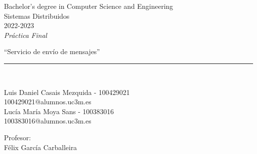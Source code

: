 \def\degree{Bachelor's degree in Computer Science and Engineering}
\def\subject{Sistemas Distribuidos}
\def\year{2022-2023}
\def\labType{Práctica Final}
\def\labName{Servicio de envío de mensajes}
\def\proffesor{Félix García Carballeira}

\begin{titlepage}
	\begin{sffamily}
	\color{azulUC3M}
	\begin{center}

		\begin{figure}[H]
		\end{figure}
		\vspace{1.5cm}

		\begin{Large}
			\degree\\
            \subject\\
			\year\\
			\vspace{2cm}		
			\textsl{\labType}
			\bigskip
			
		\end{Large}

		{\Huge ``\labName''}\\

		\vspace*{0.5cm}
		\rule{10.5cm}{0.1mm}\\
		\vspace*{0.9cm}
		
		{\LARGE Luis Daniel Casais Mezquida - 100429021}\\
		{100429021@alumnos.uc3m.es}\\
		\vspace*{0.4cm}
		{\LARGE Lucía María Moya Sans - 100383016}\\
		{100383016@alumnos.uc3m.es}\\
        \vspace*{0.4cm}

		\vspace*{0.8cm}
		
		\begin{Large}
		    Profesor:\\
			\proffesor\\
		\end{Large}

	\end{center}
	\vfill
	\end{sffamily}
\end{titlepage}